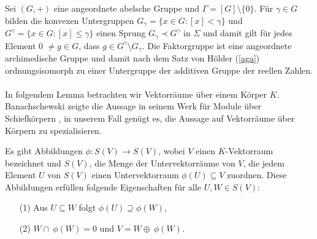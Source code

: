 Sei $\left(G, +\right)$ eine angeordnete abelsche Gruppe und $\Gamma = [G]\setminus \lbrace 0\rbrace$. Für $\gamma \in G$ bilden die konvexen Untergruppen 
$G_\gamma = \lbrace x \in G: [x] < \gamma\rbrace $ und $G^\gamma= \lbrace x \in G: [x] \le \gamma \rbrace $ einen Sprung $ G_\gamma \prec G^\gamma$ in $\Sigma$ und damit gilt für jedes Element 0 $\neq g \in G$, dass $g \in G^\gamma \setminus G_\gamma $. Die Faktorgruppe ist eine angeordnete archimedische Gruppe und damit nach dem Satz von Hölder (\ref{aga}) ordnungsisomorph zu einer Untergruppe der additiven Gruppe der reellen Zahlen.\cite{hahn07}\\\\
In folgendem Lemma betrachten wir Vektorräume über einem Körper $K$. Banachschewski zeigte die Aussage in seinem Werk für Module über Schiefkörpern \cite[Lemma 4, S. 431 - 433]{banachschewski56}, in unserem Fall genügt es, die Aussage auf Vektorräume über Körpern zu spezialisieren. 
\begin{lemma}\label{einbettungssatzLemma}
Es gibt Abbildungen $\phi: S(V) \rightarrow S(V)$, wobei $V$ einen $K$-Vektorraum bezeichnet und $S(V)$, die Menge der Untervektorräume von $V$, die jedem Element $U$ von $S(V)$ einen Untervektorraum $\phi(U)\subseteq V$ zuordnen. Diese Abbildungen erfüllen folgende Eigenschaften für alle $U, W \in S(V)$: \\
\begin{enumerate}
\item[(1)] Aus $U \subseteq W $ folgt $\phi(U) \supseteq \phi(W)$,
\item[(2)] $W \cap ~\phi(W) = 0$ und $V = W \oplus ~ \phi(W)$.
\end{enumerate} 
\end{lemma}
